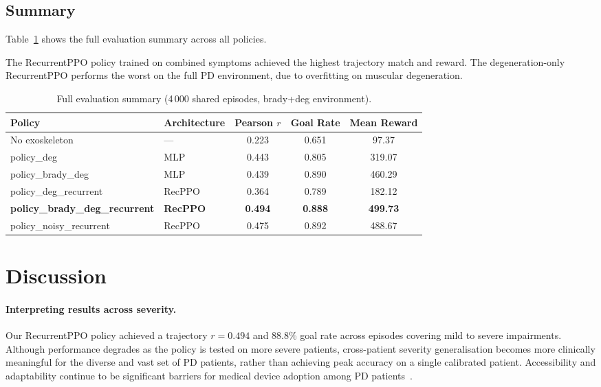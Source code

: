 \documentclass[letterpaper]{article} %
\begin{document}
\subsection{Summary}

Table~\ref{tab:summary} shows the full evaluation summary across all policies.

The RecurrentPPO policy trained on combined symptoms achieved the highest
trajectory match and reward.
The degeneration-only RecurrentPPO performs the worst on the full PD environment,
due to overfitting on muscular degeneration.

\begin{table}[tbp]
  \centering
  \caption{Full evaluation summary (4\,000 shared episodes, brady+deg
    environment).}
  \label{tab:summary}
  \small
  \begin{tabular}{llccc}
    \toprule
    \textbf{Policy} & \textbf{Architecture} & \textbf{Pearson $r$}
      & \textbf{Goal Rate} & \textbf{Mean Reward} \\
    \midrule
    No exoskeleton        & ---     & 0.223 & 0.651 &  97.37 \\
    policy\_deg           & MLP     & 0.443 & 0.805 & 319.07 \\
    policy\_brady\_deg    & MLP     & 0.439 & 0.890 & 460.29 \\
    policy\_deg\_recurrent & RecPPO & 0.364 & 0.789 & 182.12 \\
    \textbf{policy\_brady\_deg\_recurrent}
                          & \textbf{RecPPO} & \textbf{0.494}
                          & \textbf{0.888} & \textbf{499.73} \\
    policy\_noisy\_recurrent & RecPPO & 0.475 & 0.892 & 488.67 \\
    \bottomrule
  \end{tabular}
\end{table}

\section{Discussion}
\label{sec:discussion}

\paragraph{Interpreting results across severity.}
Our RecurrentPPO policy achieved a trajectory $r{=}0.494$ and 88.8\% goal rate
across episodes covering mild to severe impairments.
Although performance degrades as the policy is tested on more severe patients,
cross-patient severity generalisation becomes more clinically meaningful for the
diverse and vast set of PD patients, rather than achieving peak accuracy on a
single calibrated patient.
Accessibility and adaptability continue to be significant barriers for medical
device adoption among PD patients~\citep{hirczy2024, reicherzer2024}.
\end{document}
